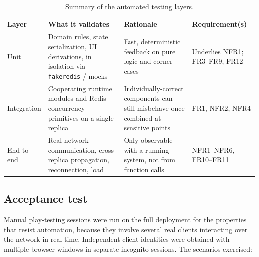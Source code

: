 \documentclass{scrartcl}
\begin{document}
\begin{table}
      \centering
      \small
      \begin{tabular}{p{2.1cm} p{3.4cm} p{4.2cm} p{2.5cm}}
            \toprule
            \textbf{Layer} & \textbf{What it validates}                                                                     & \textbf{Rationale}                                                                    & \textbf{Requirement(s)}        \\
            \midrule
            Unit           & Domain rules, state serialization, UI derivations, in isolation via \texttt{fakeredis} / mocks & Fast, deterministic feedback on pure logic and corner cases                           & Underlies NFR1; FR3--FR9, FR12 \\
            Integration    & Cooperating runtime modules and Redis concurrency primitives on a single replica               & Individually-correct components can still misbehave once combined at sensitive points & FR1, NFR2, NFR4                \\
            End-to-end     & Real network communication, cross-replica propagation, reconnection, load                      & Only observable with a running system, not from function calls                        & NFR1--NFR6, FR10--FR11         \\
            \bottomrule
      \end{tabular}
      \caption{Summary of the automated testing layers.}
      \label{tab:test-summary}
\end{table}

\subsection{Acceptance test}\label{acceptance-test}

Manual play-testing sessions were run on the full deployment for the properties
that resist automation, because they involve several real clients interacting over
the network in real time. Independent client identities were obtained with
multiple browser windows in separate incognito sessions. The scenarios exercised:
\end{document}

